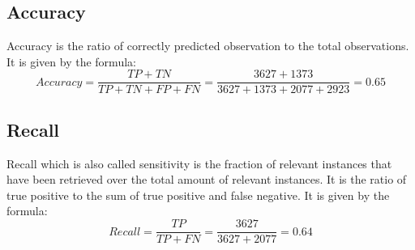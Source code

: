 \subsection*{Accuracy}
Accuracy is the ratio of correctly predicted observation to the total observations. It is given by the formula:
$$Accuracy = \frac{TP+TN}{TP+TN+FP+FN}= \frac{3627+1373}{3627+1373+2077+2923}=0.65$$
\subsection{Recall}
Recall which is also called sensitivity is the fraction of relevant instances that have been retrieved over the total amount of relevant instances. It is the ratio of true positive to the sum of true positive and false negative. It is given by the formula:
$$Recall = \frac{TP}{TP+FN} = \frac{3627}{3627+2077}= 0.64$$






